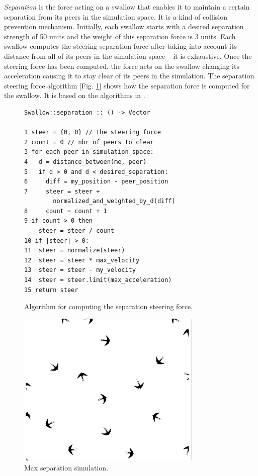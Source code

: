 \documentclass[../main]{subfiles}
\begin{document}
{\em Separation} is the force acting on a swallow that enables it to maintain a certain separation from its peers in the simulation space. It is a kind of collision prevention mechanism. Initially, each swallow starts with a desired separation strength of 50 units and the weight of this separation force is 3 units. Each swallow computes the steering separation force after taking into account its distance from all of its peers in the simulation space -- it is exhaustive. Once the steering force has been computed, the force acts on the swallow changing its acceleration causing it to stay clear of its peers in the simulation. The separation steering force algorithm [Fig. \ref{separationLogic}] shows how the separation force is computed for the swallow. It is based on the algorithms in \cite{reynolds1999steering, danshiffman}.

\begin{figure}
	\begin{verbatim}
Swallow::separation :: () -> Vector

1 steer = {0, 0} // the steering force
2 count = 0 // nbr of peers to clear
3 for each peer in simulation_space:
4   d = distance_between(me, peer)
5   if d > 0 and d < desired_separation:
6     diff = my_position - peer_position
7     steer = steer + 
        normalized_and_weighted_by_d(diff)
8     count = count + 1
9 if count > 0 then
    steer = steer / count
10 if |steer| > 0:
11  steer = normalize(steer)
12  steer = steer * max_velocity
13  steer = steer - my_velocity
14  steer = steer.limit(max_acceleration)
15 return steer
    \end{verbatim}
	\caption{Algorithm for computing the separation steering force.}
	\label{separationLogic}
\end{figure}

\begin{figure}
    \centering
	\includegraphics[scale=0.30, width=250pt]{resources/flocker_max_separation.png}
	\caption{Max separation simulation.}
	\label{maxSeparationImg}
\end{figure}
\end{document}
